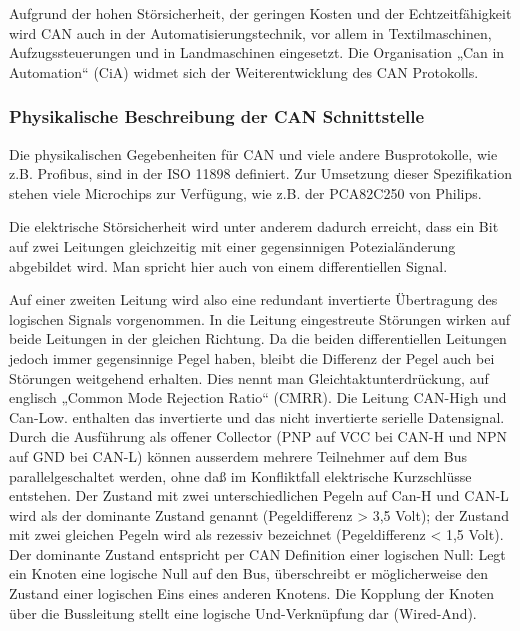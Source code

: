 Aufgrund der hohen Störsicherheit, der geringen Kosten und der Echtzeitfähigkeit wird
CAN auch in der Automatisierungstechnik, vor allem in Textilmaschinen,
Aufzugssteuerungen und in Landmaschinen eingesetzt.
Die Organisation „Can in Automation“ (CiA) widmet sich der Weiterentwicklung des CAN
Protokolls.

\subsubsection{Physikalische Beschreibung der CAN Schnittstelle}

Die physikalischen Gegebenheiten für CAN und viele andere Busprotokolle, wie z.B.
Profibus, sind in der ISO 11898 definiert. Zur Umsetzung dieser Spezifikation stehen viele
Microchips zur Verfügung, wie z.B. der PCA82C250 von Philips.

Die elektrische Störsicherheit wird unter anderem dadurch erreicht, dass ein Bit auf zwei
Leitungen gleichzeitig mit einer gegensinnigen Potezialänderung abgebildet wird. Man
spricht hier auch von einem differentiellen Signal.

Auf einer zweiten Leitung wird also eine redundant invertierte Übertragung des logischen
Signals vorgenommen.
In die Leitung eingestreute Störungen wirken auf beide Leitungen in der gleichen
Richtung. Da die beiden differentiellen Leitungen jedoch immer gegensinnige Pegel
haben, bleibt die Differenz der Pegel auch bei Störungen weitgehend erhalten. Dies nennt
man Gleichtaktunterdrückung, auf englisch „Common Mode Rejection Ratio“ (CMRR). Die 
Leitung CAN-High und Can-Low. enthalten das invertierte und das nicht invertierte serielle
Datensignal.
Durch die Ausführung als offener Collector (PNP auf VCC bei CAN-H und NPN auf GND
bei CAN-L) können ausserdem mehrere Teilnehmer auf dem Bus parallelgeschaltet
werden, ohne daß im Konfliktfall elektrische Kurzschlüsse entstehen.
Der Zustand mit zwei unterschiedlichen Pegeln auf Can-H und CAN-L wird als der
dominante Zustand genannt (Pegeldifferenz > 3,5 Volt); der Zustand mit zwei gleichen
Pegeln wird als rezessiv bezeichnet (Pegeldifferenz < 1,5 Volt).
Der dominante Zustand entspricht per CAN Definition einer logischen Null: Legt ein
Knoten eine logische Null auf den Bus, überschreibt er möglicherweise den Zustand einer
logischen Eins eines anderen Knotens. Die Kopplung der Knoten über die Bussleitung
stellt eine logische Und-Verknüpfung dar (Wired-And).

